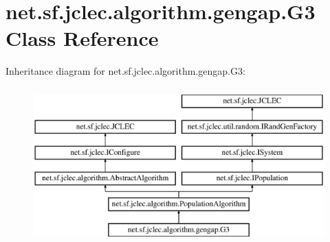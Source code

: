 \hypertarget{classnet_1_1sf_1_1jclec_1_1algorithm_1_1gengap_1_1_g3}{\section{net.\-sf.\-jclec.\-algorithm.\-gengap.\-G3 Class Reference}
\label{classnet_1_1sf_1_1jclec_1_1algorithm_1_1gengap_1_1_g3}
}
Inheritance diagram for net.\-sf.\-jclec.\-algorithm.\-gengap.\-G3\-:\begin{figure}[H]
\begin{center}
\leavevmode
\includegraphics[height=6.000000cm]{classnet_1_1sf_1_1jclec_1_1algorithm_1_1gengap_1_1_g3}
\end{center}
\end{figure}
